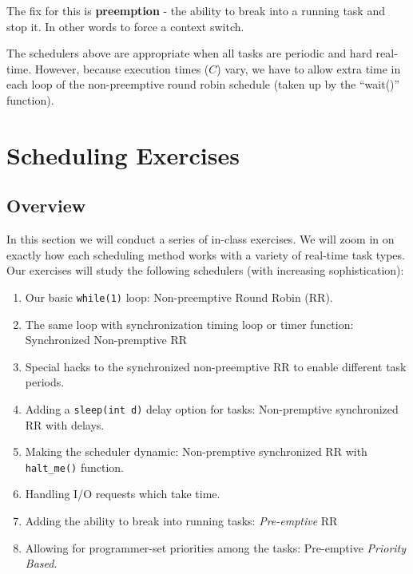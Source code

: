 \documentclass{article}	%
\begin{document}
The fix for this is {\bf preemption} - the ability to break into a running task and 
stop it. In other words to force a context switch. 


The schedulers above are appropriate when all tasks are periodic and hard real-time.
However, because execution times ($C$) vary, we have to allow  extra time in
each loop of the non-preemptive round robin schedule (taken up by the ``wait()'' function).



\section{Scheduling Exercises}


\subsection{Overview}

In this section we will conduct a series of in-class exercises.  We will zoom in on exactly how each scheduling method works with a variety of real-time task types.   Our exercises will study the following schedulers (with increasing sophistication):
\begin{enumerate}
  \item Our basic {\tt while(1)} loop:  Non-preemptive Round Robin (RR).
  \item The same loop with synchronization timing loop or timer function: Synchronized Non-premptive RR
  \item Special hacks to the synchronized non-preemptive RR to enable different task periods. 
  \item Adding a {\tt sleep(int d)} delay option for tasks: Non-premptive synchronized RR with delays.
  \item Making the scheduler dynamic: Non-premptive synchronized RR with {\tt halt\_me()} function.
  \item Handling I/O requests which take time.
  \item Adding the ability to break into running tasks: {\it Pre-emptive} RR
  \item Allowing for programmer-set priorities among the tasks: Pre-emptive {\it Priority Based}.
\end{enumerate}
\end{document}
